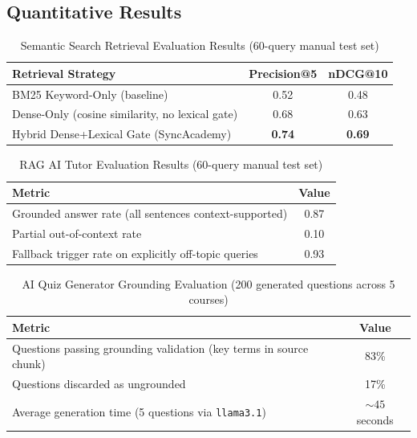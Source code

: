 \documentclass[12pt,a4paper]{report}
\begin{document}
\subsection{Quantitative Results}

\begin{table}[htbp]
\caption{Semantic Search Retrieval Evaluation Results (60-query manual test set)}
\label{tab:search_results}
\centering
\begin{tabular}{|l|c|c|}
\hline
\textbf{Retrieval Strategy} & \textbf{Precision@5} & \textbf{nDCG@10} \\
\hline
BM25 Keyword-Only (baseline) & 0.52 & 0.48 \\
Dense-Only (cosine similarity, no lexical gate) & 0.68 & 0.63 \\
Hybrid Dense+Lexical Gate (SyncAcademy) & \textbf{0.74} & \textbf{0.69} \\
\hline
\end{tabular}
\end{table}

\begin{table}[htbp]
\caption{RAG AI Tutor Evaluation Results (60-query manual test set)}
\label{tab:rag_results}
\centering
\begin{tabular}{|l|c|}
\hline
\textbf{Metric} & \textbf{Value} \\
\hline
Grounded answer rate (all sentences context-supported) & 0.87 \\
Partial out-of-context rate & 0.10 \\
Fallback trigger rate on explicitly off-topic queries & 0.93 \\
\hline
\end{tabular}
\end{table}

\begin{table}[htbp]
\caption{AI Quiz Generator Grounding Evaluation (200 generated questions across 5 courses)}
\label{tab:quiz_results}
\centering
\begin{tabular}{|l|c|}
\hline
\textbf{Metric} & \textbf{Value} \\
\hline
Questions passing grounding validation (key terms in source chunk) & 83\% \\
Questions discarded as ungrounded & 17\% \\
Average generation time (5 questions via \texttt{llama3.1}) & ${\sim}45$ seconds \\
\hline
\end{tabular}
\end{table}
\end{document}
